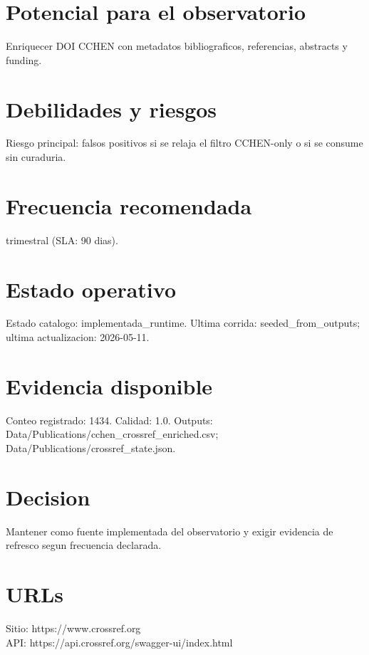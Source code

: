 \documentclass[10pt,a4paper]{article}
\begin{document}
\section*{Potencial para el observatorio}
Enriquecer DOI CCHEN con metadatos bibliograficos, referencias, abstracts y funding.

\section*{Debilidades y riesgos}
Riesgo principal: falsos positivos si se relaja el filtro CCHEN-only o si se consume sin curaduria.

\section*{Frecuencia recomendada}
trimestral (SLA: 90 dias).

\section*{Estado operativo}
Estado catalogo: implementada\_runtime. Ultima corrida: seeded\_from\_outputs; ultima actualizacion: 2026-05-11.

\section*{Evidencia disponible}
Conteo registrado: 1434. Calidad: 1.0. Outputs: Data/Publications/cchen\_crossref\_enriched.csv; Data/Publications/crossref\_state.json.

\section*{Decision}
Mantener como fuente implementada del observatorio y exigir evidencia de refresco segun frecuencia declarada.


\section*{URLs}
Sitio: https://www.crossref.org\\
API: https://api.crossref.org/swagger-ui/index.html
\end{document}
